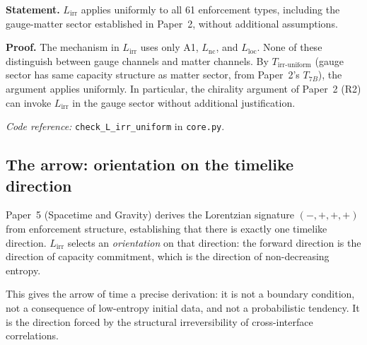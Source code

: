 \documentclass[11pt]{article}
\newcommand{\coderef}[2]{\smallskip\noindent\textit{Code reference:} \texttt{#1} in \texttt{#2}.}
\newcommand{\epitag}[1]{\textbf{[#1]}}
\begin{document}
\begin{tcolorbox}[apfbox, title={Lemma $L_{\mathrm{irr\text{-}uniform}}$ (Sector-Uniform Irreversibility) \epitag{P}}]
\textbf{Statement.}  $L_{\mathrm{irr}}$ applies uniformly to all 61
enforcement types, including the gauge-matter sector established in Paper~2,
without additional assumptions.

\textbf{Proof.}  The mechanism in $L_{\mathrm{irr}}$ uses only A1,
$L_{\mathrm{nc}}$, and $L_{\mathrm{loc}}$.  None of these distinguish between
gauge channels and matter channels.  By $T_{\mathrm{irr\text{-}uniform}}$
(gauge sector has same capacity structure as matter sector, from Paper~2's
$T_{7B}$), the argument applies uniformly.  In particular, the chirality
argument of Paper~2 (R2) can invoke $L_{\mathrm{irr}}$ in the gauge sector
without additional justification.

\coderef{check\_L\_irr\_uniform}{core.py}
\end{tcolorbox}

\subsection{The arrow: orientation on the timelike direction}

Paper~5 (Spacetime and Gravity) derives the Lorentzian signature
$(-,+,+,+)$ from enforcement structure, establishing that there is exactly
one timelike direction.  $L_{\mathrm{irr}}$ selects an \emph{orientation} on
that direction: the forward direction is the direction of capacity commitment,
which is the direction of non-decreasing entropy.

This gives the arrow of time a precise derivation: it is not a boundary
condition, not a consequence of low-entropy initial data, and not a
probabilistic tendency.  It is the direction forced by the structural
irreversibility of cross-interface correlations.
\end{document}
